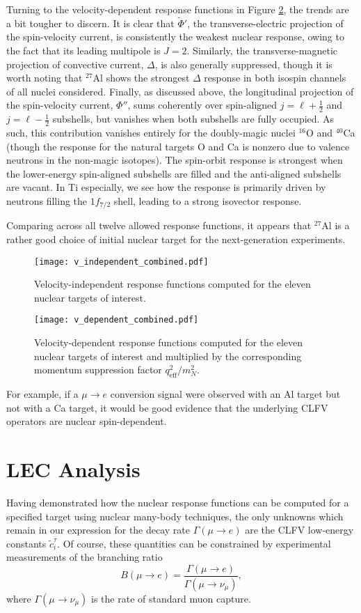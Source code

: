 \documentclass{book}[letterpaper,12pt]
\begin{document}
Turning to the velocity-dependent response functions in Figure \ref{fig:v_dep_responses}, the trends are a bit tougher to discern. It is clear that $\tilde{\Phi}'$, the transverse-electric projection of the spin-velocity current, is consistently the weakest nuclear response, owing to the fact that its leading multipole is $J=2$. Similarly, the transverse-magnetic projection of convective current, $\Delta$, is also generally suppressed, though it is worth noting that $^{27}$Al shows the strongest $\Delta$ response in both isospin channels of all nuclei considered. Finally, as discussed above, the longitudinal projection of the spin-velocity current, $\Phi''$, sums coherently over spin-aligned $j=\ell+\frac{1}{2}$ and $j=\ell-\frac{1}{2}$ subshells, but vanishes when both subshells are fully occupied. As such, this contribution vanishes entirely for the doubly-magic nuclei $^{16}$O and $^{40}$Ca (though the response for the natural targets O and Ca is nonzero due to valence neutrons in the non-magic isotopes). The spin-orbit response is strongest when the lower-energy spin-aligned subshells are filled and the anti-aligned subshells are vacant. In Ti especially, we see how the response is primarily driven by neutrons filling the $1f_{7/2}$ shell, leading to a strong isovector response.

Comparing across all twelve allowed response functions, it appears that $^{27}$Al is a rather good choice of initial nuclear target for the next-generation experiments.
\begin{figure}
\centering
\texttt{[image: v\_independent\_combined.pdf]}
\caption{Velocity-independent response functions computed for the eleven nuclear targets of interest.}
\label{fig:v_ind_responses}
\end{figure}
\begin{figure}
\centering
\texttt{[image: v\_dependent\_combined.pdf]}
\caption{Velocity-dependent response functions computed for the eleven nuclear targets of interest and multiplied by the corresponding momentum suppression factor $q_\mathrm{eff}^2/m_N^2$.}
\label{fig:v_dep_responses}
\end{figure}
For example, if a $\mu\rightarrow e$ conversion signal were observed with an Al target but not with a Ca target, it would be good evidence that the underlying CLFV operators are nuclear spin-dependent.
\chapter{LEC Analysis}
\label{chap:lec_analysis}
\thispagestyle{headings}
Having demonstrated how the nuclear response functions can be computed for a specified target using nuclear many-body techniques, the only unknowns which remain in our expression for the decay rate $\Gamma(\mu\rightarrow e)$ are the CLFV low-energy constants $\tilde{c}_i^{\tau}$. Of course, these quantities can be constrained by experimental measurements of the branching ratio 
\begin{equation}
B\left(\mu\rightarrow e\right)=\frac{\Gamma\left(\mu\rightarrow e\right)}{\Gamma\left(\mu\rightarrow \nu_{\mu}\right)},
\end{equation}
where $\Gamma(\mu\rightarrow \nu_{\mu})$ is the rate of standard muon capture. 
\end{document}
